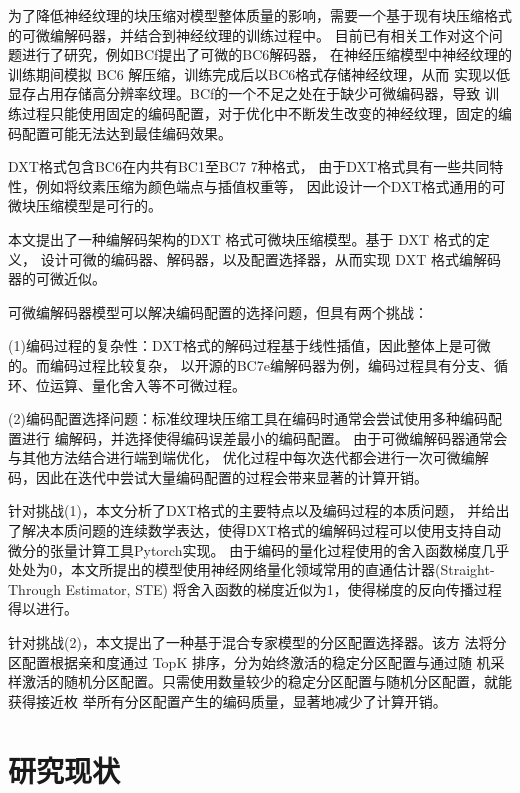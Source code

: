 为了降低神经纹理的块压缩对模型整体质量的影响，需要一个基于现有块压缩格式的可微编解码器，并结合到神经纹理的训练过程中。
目前已有相关工作对这个问题进行了研究，例如BCf\cite{weinreich2024real}提出了可微的BC6解码器，
在神经压缩模型中神经纹理的训练期间模拟 BC6 解压缩，训练完成后以BC6格式存储神经纹理，从而
实现以低显存占用存储高分辨率纹理。BCf\cite{weinreich2024real}的一个不足之处在于缺少可微编码器，导致
训练过程只能使用固定的编码配置，对于优化中不断发生改变的神经纹理，固定的编码配置可能无法达到最佳编码效果。

DXT格式包含BC6在内共有BC1至BC7 7种格式，
由于DXT格式具有一些共同特性，例如将纹素压缩为颜色端点与插值权重等，
因此设计一个DXT格式通用的可微块压缩模型是可行的。

本文提出了一种编解码架构的DXT 格式可微块压缩模型。基于 DXT 格式的定义，
设计可微的编码器、解码器，以及配置选择器，从而实现 DXT 格式编解码器的可微近似。

可微编解码器模型可以解决编码配置的选择问题，但具有两个挑战：

(1)编码过程的复杂性：DXT格式的解码过程基于线性插值，因此整体上是可微的。而编码过程比较复杂，
以开源的BC7e编解码器为例，编码过程具有分支、循环、位运算、量化舍入等不可微过程。

(2)编码配置选择问题：标准纹理块压缩工具在编码时通常会尝试使用多种编码配置进行
编解码，并选择使得编码误差最小的编码配置。
由于可微编解码器通常会与其他方法结合进行端到端优化，
优化过程中每次迭代都会进行一次可微编解码，因此在迭代中尝试大量编码配置的过程会带来显著的计算开销。

针对挑战(1)，本文分析了DXT格式的主要特点以及编码过程的本质问题，
并给出了解决本质问题的连续数学表达，使得DXT格式的编解码过程可以使用支持自动微分的张量计算工具Pytorch实现。
由于编码的量化过程使用的舍入函数梯度几乎处处为0，本文所提出的模型使用神经网络量化领域常用的直通估计器\cite{bengio2013estimating}(Straight-Through Estimator, STE)
将舍入函数的梯度近似为1，使得梯度的反向传播过程得以进行。

针对挑战(2)，本文提出了一种基于混合专家模型的分区配置选择器。该方
法将分区配置根据亲和度通过 TopK 排序，分为始终激活的稳定分区配置与通过随
机采样激活的随机分区配置。只需使用数量较少的稳定分区配置与随机分区配置，就能获得接近枚
举所有分区配置产生的编码质量，显著地减少了计算开销。

\section{研究现状}

